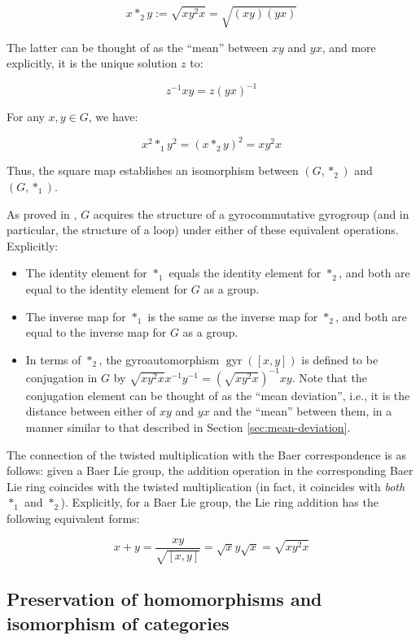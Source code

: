 $$x *_2 y := \sqrt{xy^2x} = \sqrt{(xy)(yx)}$$

The latter can be thought of as the ``mean'' between $xy$ and $yx$,
and more explicitly, it is the unique solution $z$ to:

$$z^{-1}xy = z(yx)^{-1}$$

For any $x,y \in G$, we have:

$$x^2 *_1 y^2  = (x *_2 y)^2 = xy^2x$$

Thus, the square map establishes an isomorphism between $(G,*_2)$ and
$(G,*_1)$.

As proved in \cite{Foguelinv}, $G$ acquires the
structure of a gyrocommutative gyrogroup (and in particular, the
structure of a loop) under either of these equivalent
operations. Explicitly:

\begin{itemize}
\item The identity element for $*_1$ equals the identity element for
  $*_2$, and both are equal to the identity element for $G$ as a group.
\item The inverse map for $*_1$ is the same as the inverse map for
  $*_2$, and both are equal to the inverse map for $G$ as a group.
\item In terms of $*_2$, the gyroautomorphism
  $\operatorname{gyr}([x,y])$ is defined to be conjugation in $G$ by
  $\sqrt{xy^2x}x^{-1}y^{-1} = (\sqrt{xy^2x})^{-1}xy$. Note that the
  conjugation element can be thought of as the ``mean deviation'',
  i.e., it is the distance between either of $xy$ and $yx$ and the
  ``mean'' between them, in a manner similar to that described in
  Section \ref{sec:mean-deviation}.
\end{itemize}

The connection of the twisted multiplication with the Baer
correspondence is as follows: given a Baer Lie group, the addition
operation in the corresponding Baer Lie ring coincides with the
twisted multiplication (in fact, it coincides with {\em both} $*_1$
and $*_2$). Explicitly, for a Baer Lie group, the Lie ring addition
has the following equivalent forms:

$$x + y = \frac{xy}{\sqrt{[x,y]}} = \sqrt{x}y\sqrt{x} = \sqrt{xy^2x}$$

\subsection{Preservation of homomorphisms and isomorphism of categories}\label{sec:baer-correspondence-homomorphism-preservation}

